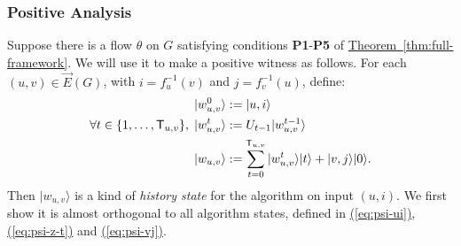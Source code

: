 \documentclass{article}
\newcommand{\eq}[1]{\hyperref[eq:#1]{(\ref*{eq:#1})}}
\newcommand{\thm}[1]{\hyperref[thm:#1]{Theorem~\ref*{thm:#1}}}
\def\ket#1{{\lvert}#1\rangle}
\renewcommand{\>}{\rangle}
\newcommand{\<}{\langle}
\renewcommand{\(}{\left(}
\renewcommand{\)}{\right)}
\begin{document}
\subsubsection{Positive Analysis}\label{sec:fwk-positive}


Suppose there is a flow $\theta$ on $G$ satisfying conditions \textbf{P1}-\textbf{P5} of \thm{full-framework}. We will use it to make a positive witness as follows. For each $(u,v)\in \overrightarrow{E}(G)$, with $i=f^{-1}_u(v)$ and $j=f_v^{-1}(u)$, define:
\begin{equation}
\begin{split}
\ket{w_{u,v}^0} &:= \ket{u,i}\\
\forall t\in \{1,\dots,{\sf T}_{u,v}\},\; \ket{w_{u,v}^t} &:= U_{t-1}\ket{w_{u,v}^{t-1}}\\
\ket{w_{u,v}} &:= \sum_{t=0}^{{\sf T}_{u,v}}\ket{w_{u,v}^t}\ket{t}+\ket{v,j}\ket{0}.
\end{split}\label{eq:full-fwk-w_uv}
\end{equation}
Then $\ket{w_{u,v}}$ is a kind of \emph{history state} \cite{kitaev1999quantum} for the algorithm on input $(u,i)$. We first show it is almost orthogonal to all algorithm states, defined in \eq{psi-ui}, \eq{psi-z-t} and \eq{psi-vj}.
\end{document}
